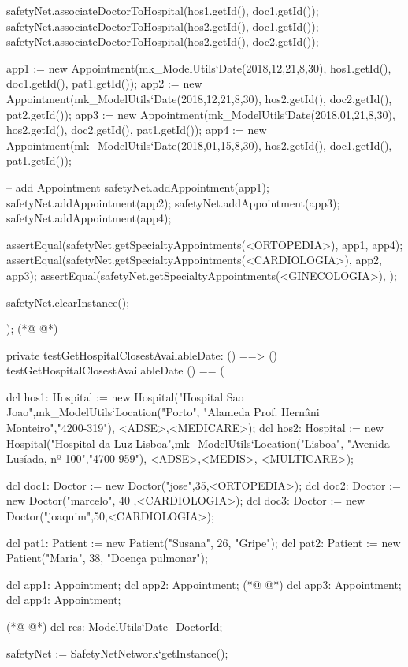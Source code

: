\begin{vdmpp}[breaklines=true]
  safetyNet.associateDoctorToHospital(hos1.getId(), doc1.getId());
  safetyNet.associateDoctorToHospital(hos2.getId(), doc1.getId());
  safetyNet.associateDoctorToHospital(hos2.getId(), doc2.getId());

  app1 := new Appointment(mk_ModelUtils`Date(2018,12,21,8,30), hos1.getId(), doc1.getId(), pat1.getId());
  app2 := new Appointment(mk_ModelUtils`Date(2018,12,21,8,30), hos2.getId(), doc2.getId(), pat2.getId());
  app3 := new Appointment(mk_ModelUtils`Date(2018,01,21,8,30), hos2.getId(), doc2.getId(), pat1.getId());
  app4 := new Appointment(mk_ModelUtils`Date(2018,01,15,8,30), hos2.getId(), doc1.getId(), pat1.getId());
    
  -- add Appointment
  safetyNet.addAppointment(app1);
  safetyNet.addAppointment(app2);
  safetyNet.addAppointment(app3);
  safetyNet.addAppointment(app4);
  
  assertEqual(safetyNet.getSpecialtyAppointments(<ORTOPEDIA>), {app1, app4});
  assertEqual(safetyNet.getSpecialtyAppointments(<CARDIOLOGIA>), {app2, app3});
  assertEqual(safetyNet.getSpecialtyAppointments(<GINECOLOGIA>), {});
  
  
  safetyNet.clearInstance();
    
);
(*@
\label{testGetNextAppointmentDate:964}
@*)

private testGetHospitalClosestAvailableDate: () ==> ()
 testGetHospitalClosestAvailableDate () == (
 
  dcl hos1: Hospital := new Hospital("Hospital Sao Joao",mk_ModelUtils`Location("Porto", "Alameda Prof. Hernâni Monteiro","4200-319"), {<ADSE>,<MEDICARE>});
  dcl hos2: Hospital := new Hospital("Hospital da Luz Lisboa",mk_ModelUtils`Location("Lisboa", "Avenida Lusíada, nº 100","4700-959"), {<ADSE>,<MEDIS>, <MULTICARE>});
  
  dcl doc1: Doctor := new Doctor("jose",35,<ORTOPEDIA>);
  dcl doc2: Doctor := new Doctor("marcelo", 40 ,<CARDIOLOGIA>);
  dcl doc3: Doctor := new Doctor("joaquim",50,<CARDIOLOGIA>);
  
  dcl pat1: Patient := new Patient("Susana", 26, "Gripe");
  dcl pat2: Patient := new Patient("Maria", 38, "Doença pulmonar");
  
  dcl app1: Appointment;
  dcl app2: Appointment;
(*@
\label{testForogotToAddDoctor:980}
@*)
  dcl app3: Appointment;
  dcl app4: Appointment;
  
(*@
\label{testFailForgotToAddDoctor:983}
@*)
  dcl res: ModelUtils`Date_DoctorId;
  
  safetyNet := SafetyNetNetwork`getInstance();
   

\end{vdmpp}
